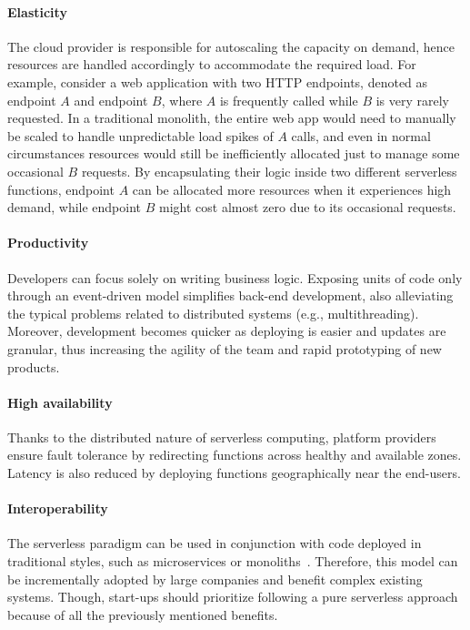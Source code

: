 \paragraph{\textbf{Elasticity}} The cloud provider is responsible for autoscaling the capacity
on demand, hence resources are handled accordingly to accommodate the required load.
For example, consider a web application with two HTTP endpoints, denoted as endpoint $A$ and endpoint $B$,
where $A$ is frequently called while $B$ is very rarely requested.
In a traditional monolith, the entire web app would need to manually be scaled
to handle unpredictable load spikes of $A$ calls, and even in normal circumstances
resources would still be inefficiently allocated just to manage some occasional $B$ requests.
By encapsulating their logic inside two different serverless functions,
endpoint $A$ can be allocated more resources when it experiences high demand,
while endpoint $B$ might cost almost zero due to its occasional requests.

\paragraph{\textbf{Productivity}} Developers can focus solely on writing
business logic. Exposing units of code only through an event-driven model simplifies back-end development,
also alleviating the typical problems related to distributed systems (e.g., multithreading).
Moreover, development becomes quicker as deploying is easier and updates are granular,
thus increasing the agility of the team and rapid prototyping of new products.

\paragraph{\textbf{High availability}} Thanks to the distributed nature of serverless computing,
platform providers ensure fault tolerance by redirecting functions across healthy and available zones.
Latency is also reduced by deploying functions geographically near the end-users.

\paragraph{\textbf{Interoperability}} The serverless paradigm can be used in
conjunction with code deployed in traditional styles,
such as microservices or monoliths~\cite{serverless-wikipedia}.
Therefore, this model can be incrementally adopted by large companies and benefit
complex existing systems. Though, start-ups should prioritize following a pure serverless approach
because of all the previously mentioned benefits.

